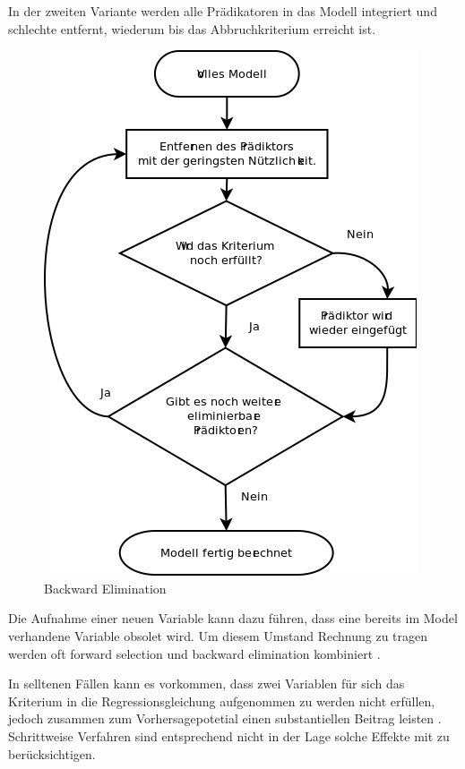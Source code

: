 \documentclass[english,12pt,doc]{apa}
\begin{document}
In der zweiten Variante werden alle Prädikatoren in das Modell integriert und schlechte entfernt, wiederum bis das Abbruchkriterium erreicht ist. 
\begin{figure}[hb]
	\centering
	\includegraphics[width=\textwidth]{backward_stepwise.png}
	\caption{Backward Elimination}
	\label{fig:backward_stepwise}
\end{figure}

Die Aufnahme einer neuen Variable kann dazu führen, dass eine bereits im Model verhandene Variable obsolet wird. Um diesem Umstand Rechnung zu tragen werden oft forward selection und backward elimination kombiniert \cite[p. 461]{bortz2011}. 

In selltenen Fällen kann es vorkommen, dass zwei Variablen für sich das Kriterium in die Regressionsgleichung aufgenommen zu werden nicht erfüllen, jedoch zusammen zum Vorhersagepotetial einen substantiellen Beitrag leisten \cite[p.261]{jacob2003applied}. Schrittweise Verfahren sind entsprechend nicht in der Lage solche Effekte mit zu berücksichtigen. 
\end{document}
